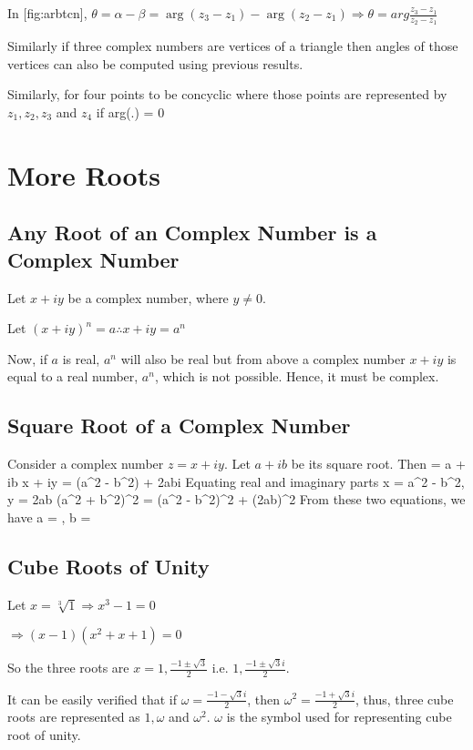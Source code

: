 In [fig:arbtcn], $\theta = \alpha - \beta = \arg(z_3 - z_1) - \arg(z_2 - z_1) \Rightarrow \theta = arg\frac{z_3 - z_1}{z_2 - z_1}$

Similarly if three complex numbers are vertices of a triangle then angles of those vertices can also be computed using previous
results.

Similarly, for four points to be concyclic where those points are represented by $z_1, z_2, z_3$ and $z_4$ if
\startformula arg\left(.\right) = 0\stopformula

\section{More Roots}
\subsection{Any Root of an Complex Number is a Complex Number}
Let $x + iy$ be a complex number, where $y \neq 0$.

Let $(x +iy)^n = a\therefore x + iy = a^n$

Now, if $a$ is real, $a^n$ will also be real but from above a complex number $x + iy$ is equal to a real number, $a^n$, which is
not possible. Hence, it must be complex.

\subsection{Square Root of a Complex Number}
Consider a complex number $z = x + iy$. Let $a + ib$ be its square root. Then
\startformula {} = a + ib \Rightarrow x + iy = (a^2 - b^2) + 2abi\stopformula
Equating real and imaginary parts
\startformula x = a^2 - b^2, y = 2ab \Rightarrow (a^2 + b^2)^2 = (a^2 - b^2)^2 + (2ab)^2\stopformula
From these two equations, we have
\startformula a = \pm{}, b = \pm{}\stopformula
\subsection{Cube Roots of Unity}
Let $x = \sqrt[3]{1} \Rightarrow x^3 - 1 = 0$

$\Rightarrow (x - 1)(x^2 + x + 1 ) = 0$

So the three roots are $x = 1, \frac{-1 \pm \sqrt{3}}{2}$ i.e. $1, \frac{-1\pm \sqrt{3}i}{2}$.

It can be easily verified that if $\omega = \frac{-1 -\sqrt{3}i}{2}$, then $\omega^2 = \frac{-1 + \sqrt{3}i}{2}$, thus, three cube
roots are represented as $1, \omega$ and $\omega^2$. $\omega$ is the symbol used for representing cube root of unity.
